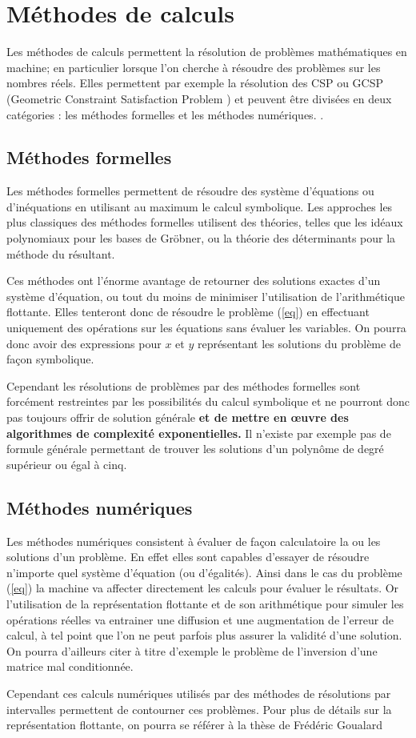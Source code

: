 \section{Méthodes de calculs}
Les méthodes de calculs permettent la résolution de problèmes mathématiques en machine; en particulier lorsque l'on cherche à résoudre des problèmes sur les nombres réels. Elles permettent par exemple la résolution des CSP  ou GCSP (Geometric Constraint Satisfaction Problem \cite{Jermann}) et peuvent être divisées en deux catégories : les méthodes formelles et les méthodes numériques. . 


\subsection{Méthodes formelles}
Les méthodes formelles permettent de résoudre des système d'équations ou d'inéquations en utilisant au maximum le calcul symbolique. Les approches les plus classiques des méthodes formelles utilisent des théories, telles que les idéaux polynomiaux pour les bases de Gröbner, ou la théorie des déterminants pour la méthode du résultant.

 Ces méthodes ont l'énorme avantage de retourner des solutions exactes d'un système d'équation, ou tout du moins de minimiser l'utilisation de l'arithmétique flottante. Elles tenteront donc de résoudre le problème (\ref{eq}) en effectuant uniquement des opérations sur les équations sans évaluer les variables. On pourra donc avoir des expressions pour $x$ et $y$ représentant les solutions du problème de façon symbolique. 

Cependant les résolutions de problèmes par des méthodes formelles sont forcément restreintes par les possibilités du calcul symbolique et ne pourront donc pas toujours offrir de solution générale \textbf{et de mettre en œuvre des algorithmes de complexité exponentielles.} Il n'existe par exemple pas de formule générale permettant de trouver les solutions d'un polynôme de degré supérieur ou égal à cinq.


\subsection{Méthodes numériques}
Les méthodes numériques consistent à évaluer de façon calculatoire la ou les solutions d'un problème. En effet elles sont capables d'essayer de résoudre n'importe quel système d'équation (ou d'égalités). Ainsi dans le cas du problème (\ref{eq}) la machine va affecter directement les calculs pour évaluer le résultats. Or l'utilisation de la représentation flottante et de son arithmétique pour simuler les opérations réelles va entrainer une diffusion et une augmentation de l'erreur de calcul, à tel point que l'on ne peut  parfois plus assurer la validité d'une solution. On pourra d'ailleurs citer à titre d'exemple le problème de l'inversion d'une matrice mal conditionnée\cite{Conditionnement}. 

Cependant ces calculs numériques utilisés  par des méthodes de résolutions par intervalles permettent de contourner ces problèmes. Pour plus de détails sur la représentation flottante, on pourra se référer à la thèse de Frédéric Goualard \cite{Goualard}

